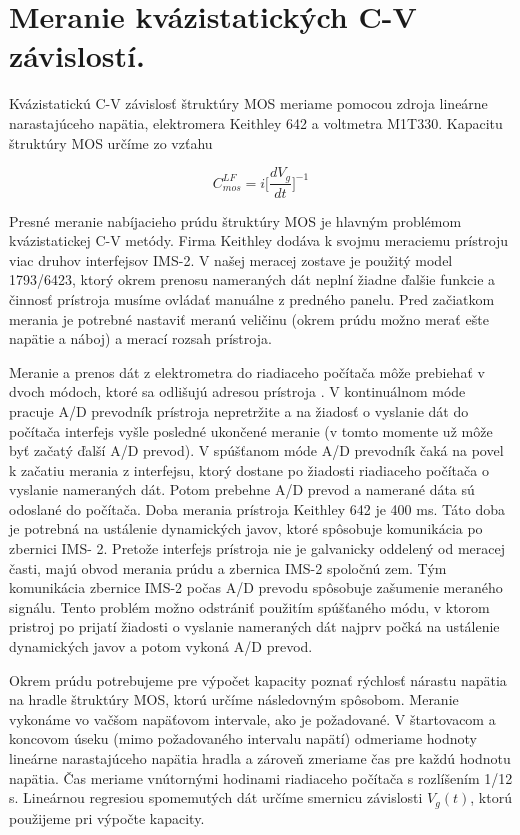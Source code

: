 \section{Meranie kvázistatických C-V závislostí.}\label{sec:5.2}

Kvázistatickú C-V závislosť štruktúry MOS meriame pomocou zdroja
lineárne narastajúceho napätia, elektromera Keithley 642 a voltmetra
M1T330. Kapacitu štruktúry MOS určíme zo vzťahu

\begin{equation}\label{eq:5.1}
C_{mos}^{LF} = i \bigg[ \frac{dV_{g}}{dt} \bigg]^{-1}
\end{equation}

Presné meranie nabíjacieho prúdu štruktúry MOS je hlavným problémom
kvázistatickej C-V metódy. Firma Keithley dodáva k svojmu meraciemu
prístroju viac druhov interfejsov IMS-2. V našej meracej zostave je
použitý model 1793/6423, ktorý okrem prenosu nameraných dát neplní
žiadne ďalšie funkcie a činnosť prístroja musíme ovládať manuálne z
predného panelu.  Pred začiatkom merania je potrebné nastaviť meranú
veličinu (okrem prúdu možno merať ešte napätie a náboj) a merací
rozsah prístroja.

Meranie a prenos dát z elektrometra do riadiaceho počítača môže
prebiehať v dvoch módoch, ktoré sa odlišujú adresou prístroja
\cite{5.3}. V kontinuálnom móde pracuje A/D prevodník prístroja
nepretržite a na žiadosť o vyslanie dát do počítača interfejs vyšle
posledné ukončené meranie (v tomto momente už môže byť začatý ďalší
A/D prevod). V spúšťanom móde A/D prevodník čaká na povel k začatiu
merania z interfejsu, ktorý dostane po žiadosti riadiaceho počítača o
vyslanie nameraných dát. Potom prebehne A/D prevod a namerané dáta sú
odoslané do počítača. Doba merania prístroja Keithley 642 je 400
ms. Táto doba je potrebná na ustálenie dynamických javov, ktoré
spôsobuje komunikácia po zbernici IMS- 2. Pretože interfejs prístroja
nie je galvanicky oddelený od meracej časti, majú obvod merania prúdu
a zbernica IMS-2 spoločnú zem. Tým komunikácia zbernice IMS-2 počas
A/D prevodu spôsobuje zašumenie meraného signálu.  Tento problém možno
odstrániť použitím spúšťaného módu, v ktorom pristroj po prijatí
žiadosti o vyslanie nameraných dát najprv počká na ustálenie
dynamických javov a potom vykoná A/D prevod.

Okrem prúdu potrebujeme pre výpočet kapacity poznať rýchlosť nárastu
napätia na hradle štruktúry MOS, ktorú určíme následovným spôsobom.
Meranie vykonáme vo vačšom napäťovom intervale, ako je požadované. V
štartovacom a koncovom úseku (mimo požadovaného intervalu napätí)
odmeriame hodnoty lineárne narastajúceho napätia hradla a zároveň
zmeriame čas pre každú hodnotu napätia. Čas meriame vnútornými
hodinami riadiaceho počítača s rozlíšením 1/12 s. Lineárnou regresiou
spomemutých dát určíme smernicu závislosti $V_{g}(t)$, ktorú použijeme
pri výpočte kapacity.

